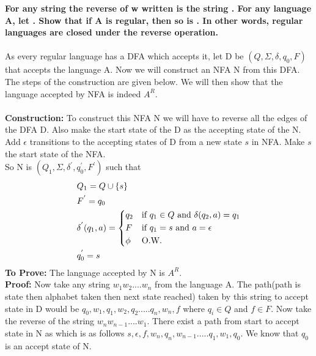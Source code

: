 \documentclass{article}
\begin{document}
\textbf{For any string  the reverse of w written  is the string 
. For any language A, let . Show that if A is regular,
 then so is . In other words, regular languages are closed under the reverse operation.}\\
\\
As every regular language has a DFA which accepts it, let D be $(Q, \Sigma, \delta, q_0, F )$ that accepts the language
 A. Now we will construct an NFA N from this DFA. The steps of the construction are given below. We will then show that 
 the language accepted by NFA is indeed $A^R$.\\
\\
\textbf{Construction:} To construct this NFA N we will have to reverse all the edges of the DFA D. Also make the start 
state of the D as the accepting state of the N. Add $\epsilon$ transitions to the accepting states of D from a new state 
$s$ in NFA. Make $s$ the start state of the NFA.\\
So N is $(Q_1, \Sigma, \delta^{'}, q_0^{'} , F^{'} )$ such that
\begin{equation}
\begin{split}
&            Q_1=Q\cup\{s\}\\
&           F^{'}=q_0\\
&           \delta^{'}(q_1,a) = 
            \begin{cases*}
            q_2 & if $q_1 \in Q$  and  $\delta(q_2,a)=q_1$\\
            F       & if $ q_1= s$ and $a=\epsilon$\\
            \phi & O.W.
            \end{cases*}\\
&           q_0^{'}=s \\
\end{split}
\end{equation}
\textbf{To Prove:} The language accepted by N is $A^R$.\\
\textbf{Proof:} Now take any string $w_1 w_2....w_n$ from the language A. The path(path is state then alphabet taken then
 next state reached) taken by this string to accept state in D would be $q_0,w_1,q_1,w_2,q_2.....q_n,w_n,f$ where $q_i\in
  Q$ and $f\in F$. Now take the reverse of the string $w_n w_{n-1}....w_1$. There exist a path from start to accept state 
  in N as which is as follows $s,\epsilon,f,w_n,q_n,w_{n-1}.....q_1,w_1,q_0$. We know that $q_0$ is an accept state of N.
\end{document}
